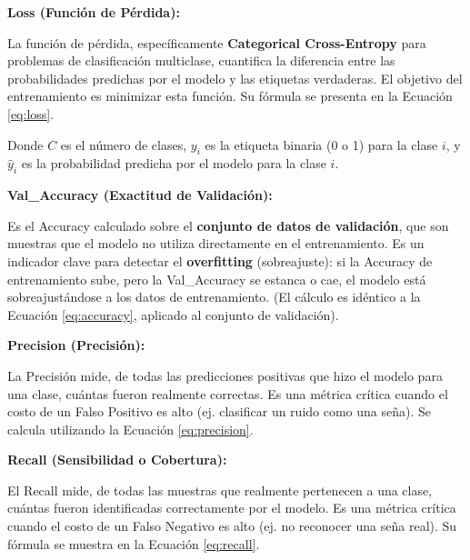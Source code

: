 \textbf{Loss (Función de Pérdida):}

La función de pérdida, específicamente \textbf{Categorical Cross-Entropy} para problemas de clasificación multiclase, cuantifica la diferencia entre las probabilidades predichas por el modelo y las etiquetas verdaderas. El objetivo del entrenamiento es minimizar esta función. Su fórmula se presenta en la Ecuación \ref{eq:loss}.

Donde $C$ es el número de clases, $y_i$ es la etiqueta binaria (0 o 1) para la clase $i$, y $\hat{y}_i$ es la probabilidad predicha por el modelo para la clase $i$.

\textbf{Val\_Accuracy (Exactitud de Validación):}

Es el Accuracy calculado sobre el \textbf{conjunto de datos de validación}, que son muestras que el modelo no utiliza directamente en el entrenamiento. Es un indicador clave para detectar el \textbf{overfitting} (sobreajuste): si la Accuracy de entrenamiento sube, pero la Val\_Accuracy se estanca o cae, el modelo está sobreajustándose a los datos de entrenamiento. (El cálculo es idéntico a la Ecuación \ref{eq:accuracy}, aplicado al conjunto de validación).

\textbf{Precision (Precisión):}

La Precisión mide, de todas las predicciones positivas que hizo el modelo para una clase, cuántas fueron realmente correctas. Es una métrica crítica cuando el costo de un Falso Positivo es alto (ej. clasificar un ruido como una seña). Se calcula utilizando la Ecuación \ref{eq:precision}.


\textbf{Recall (Sensibilidad o Cobertura):}

El Recall mide, de todas las muestras que realmente pertenecen a una clase, cuántas fueron identificadas correctamente por el modelo. Es una métrica crítica cuando el costo de un Falso Negativo es alto (ej. no reconocer una seña real). Su fórmula se muestra en la Ecuación \ref{eq:recall}.

